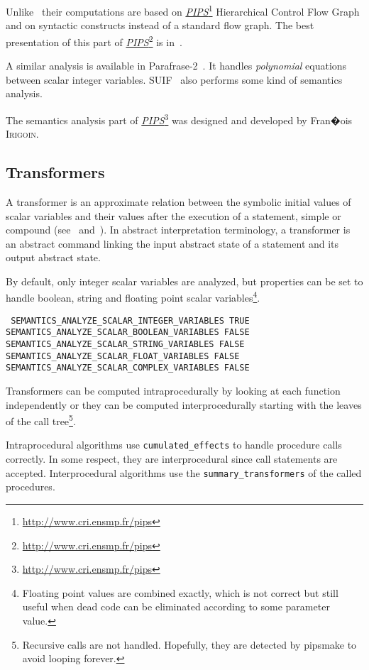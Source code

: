 \documentclass[a4paper]{report}
\newcommand{\LINK}[2]{\href{#2}{#1}\footnote{\url{#2}}\xspace}
\newcommand{\PIPS}{\LINK{\emph{PIPS}}{http://www.cri.ensmp.fr/pips}}
\begin{document}
Unlike~\cite{HC78} their computations are based on \PIPS{}
Hierarchical Control Flow Graph and on syntactic constructs instead of a
standard flow graph. The best presentation of this part of \PIPS{} is
in~\cite{Ir92}.

A similar analysis is available in Parafrase-2~\cite{}. It handles {\em
polynomial} equations between scalar integer variables. SUIF~\cite{}
also performs some kind of semantics analysis.

The semantics analysis part of \PIPS{} was designed and developed by
Fran�ois \textsc{Irigoin}.

\subsection{Transformers}
\label{subsubsection-transformers}


A transformer is an approximate relation between the symbolic initial
values of scalar variables and their values after the execution of a
statement, simple or compound (see~\cite{IJT92} and~\cite{Ir92}). In abstract
interpretation terminology, a transformer is an abstract command
linking the input abstract state of a statement and its output
abstract state.

By default, only integer scalar variables are analyzed, but properties
can be set to handle boolean, string and floating point scalar
variables\footnote{Floating point values are combined exactly, which
is not correct but still useful when dead code can be eliminated
according to some parameter value.}.

\texttt{
SEMANTICS\_ANALYZE\_SCALAR\_INTEGER\_VARIABLES TRUE
SEMANTICS\_ANALYZE\_SCALAR\_BOOLEAN\_VARIABLES FALSE
SEMANTICS\_ANALYZE\_SCALAR\_STRING\_VARIABLES FALSE
SEMANTICS\_ANALYZE\_SCALAR\_FLOAT\_VARIABLES FALSE
SEMANTICS\_ANALYZE\_SCALAR\_COMPLEX\_VARIABLES FALSE
}

Transformers can be computed intraprocedurally by looking at each
function independently or they can be computed interprocedurally
starting with the leaves of the call tree\footnote{Recursive calls are
not handled. Hopefully, they are detected by pipsmake to avoid looping
forever.}.

Intraprocedural algorithms use \verb+cumulated_effects+ to handle
procedure calls correctly. In some respect, they are interprocedural
since call statements are accepted. Interprocedural algorithms use the
\verb+summary_transformers+ of the called procedures.
\end{document}
